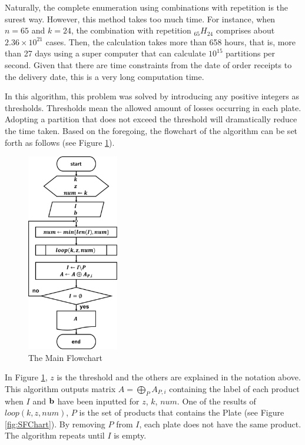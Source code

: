 \documentclass[a4paper]{amsart}
\numberwithin{equation}{section} %
\numberwithin{figure}{section} %
\numberwithin{table}{section}
\theoremstyle{plain}
\theoremstyle{definition}
\theoremstyle{plain}
\theoremstyle{plain}
\theoremstyle{plain}
\theoremstyle{plain}
\theoremstyle{plain}
\begin{document}
Naturally, the complete enumeration using combinations with repetition is the surest way. 
However, this method takes too much time. 
For instance, when $n=65$ and $k = 24$, the combination with repetition $_{65}H_{24}$ comprises about $2.36 \times 10^{21}$ cases.
Then, the calculation takes more than 658 hours, that is, more than 27 days using a super computer that can calculate $10^{15}$ partitions per second. 
Given that there are time constraints from the date of order receipts to the delivery date, this is a very long computation time.

In this algorithm, this problem was solved by introducing any positive integers as thresholds. 
Thresholds mean the allowed amount of losses occurring in each plate. 
Adopting a partition that does not exceed the threshold will dramatically reduce the time taken.
Based on the foregoing, the flowchart of the algorithm can be set forth as follows (see Figure \ref{fig:MFChart}).

\begin{figure}[h!]
	\centering
	\includegraphics[width=4cm]{MainFChart.pdf}
	\caption{The Main Flowchart}
	\label{fig:MFChart}       %
\end{figure}

In Figure \ref{fig:MFChart}, $z$ is the threshold and the others are explained in the notation above.
This algorithm outputs matrix $A=\bigoplus\limits_{P} A_{P,i}$ containing the label of each product when $I$ and ${\bf b}$ have been inputted for $z$, $k$, $num$. 
One of the results of ${loop}(k, z, num)$, $P$ is the set of products that contains the Plate (see Figure \ref{fig:SFChart}). 
By removing $P$ from $I$, each plate does not have the same product.
The algorithm repeats until $I$ is empty.
\end{document}
